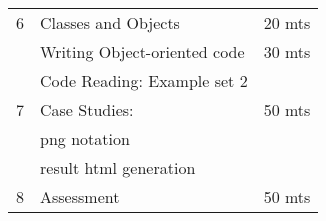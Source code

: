 \documentclass{article}
\begin{document}
\begin{tabular}{llr}
6 & Classes and Objects                                       & 20 mts\\
  & Writing Object-oriented code                              & 30 mts\\
  & Code Reading: Example set 2                               &\\\hline

7 & Case Studies:                                             & 50 mts\\
  & png notation                                              &\\              
  & result html generation                                    &\\\hline
8 & Assessment                                                & 50 mts\\\hline\hline
\end{tabular}
\end{document}
